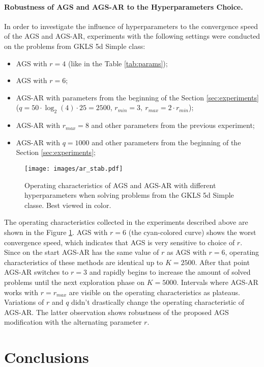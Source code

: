 \paragraph{Robustness of AGS and AGS-AR to the Hyperparameters Choice.}

In order to investigate the influence of hyperparameters to the convergence speed of the AGS and AGS-AR,
experiments with the following settings were conducted on the problems from GKLS 5d Simple class:
\begin{itemize}
  \item AGS with $r=4$ (like in the Table \ref{tab:params});
  \item AGS with $r=6$;
  \item AGS-AR with parameters from the beginning of the Section \ref{sec:experiments}
  ($q=50\cdot\log_2(4)\cdot 25 = 2500$, $r_{min}=3,\:r_{max}=2\cdot r_{min}$);
  \item AGS-AR with $r_{max}=8$ and other parameters from the previous experiment;
  \item AGS-AR with $q=1000$ and other parameters from the beginning of the Section \ref{sec:experiments};
\end{itemize}

\begin{figure}[ht]
  \centering
  \texttt{[image: images/ar\_stab.pdf]}
  \caption{Operating characteristics of AGS and AGS-AR with different hyperparameters
  when solving problems from the GKLS 5d Simple classe. Best viewed in color.}
  \label{fig:stability}
\end{figure}

The operating characteristics collected in the experiments described above are shown in the Figure \ref{fig:stability}.
AGS with $r=6$ (the cyan-colored curve) shows the worst convergence speed, which indicates that AGS is very sensitive to choice of $r$.
Since on the start AGS-AR has the same value of $r$ as AGS with $r=6$, operating characteristics of these methods
are identical up to $K=2500$. After that point AGS-AR switches to $r=3$ and rapidly begins to increase the amount of solved problems
until the next exploration phase on $K=5000$. Intervals where AGS-AR works with $r=r_{max}$ are visible on the operating characteristics as plateaus.
Variations of $r$ and $q$ didn't drastically change the operating characteristic of AGS-AR. The latter observation shows robustness of the proposed
AGS modification with the alternating parameter $r$.

\section{Conclusions}

